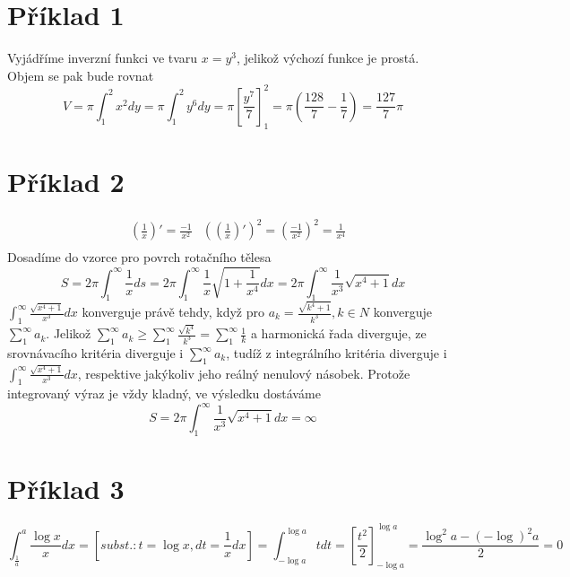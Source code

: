 \documentclass[11pt,a4paper]{article}
\begin{document}
\section*{Příklad 1}
Vyjádříme inverzní funkci ve tvaru $x = y^3$, jelikož výchozí funkce je prostá. Objem se pak bude rovnat
\begin{equation*}
V = \pi \int_1^2 x^2 dy =\pi \int_1^2 y^6 dy =\pi \left[ \frac{y^7}{7} \right]_1^2 =
\pi\left(\frac{128}{7} - \frac{1}{7}\right) = \frac{127}{7}\pi
\end{equation*}

\section*{Příklad 2}
\begin{align*}
 & \left(\frac{1}{x}\right)' = \frac{-1}{x^2} 
 & \left(\left(\frac{1}{x}\right)'\right)^2 = \left(\frac{-1}{x^2}\right)^2 = \frac{1}{x^4} \\
\end{align*}
Dosadíme do vzorce pro povrch rotačního tělesa
\begin{equation*}
S = 2\pi \int_1^\infty \frac{1}{x} ds = 2\pi \int_1^\infty \frac{1}{x}\sqrt{1+\frac{1}{x^4}} dx = 2\pi \int_1^\infty \frac{1}{x^3} \sqrt{x^4+1} dx
\end{equation*}
$
\int_1^\infty \frac{\sqrt{x^4+1}}{x^3} dx 
$
konverguje právě tehdy, když pro $a_k = \frac{\sqrt{k^4+1}}{k^3}, k\in N$ konverguje $\sum_1^\infty a_k$. Jelikož $\sum_1^\infty a_k \geq \sum_1^\infty \frac{\sqrt{k^4}}{k^3} = \sum_1^\infty \frac{1}{k}$ a harmonická řada diverguje, ze srovnávacího kritéria diverguje i $\sum_1^\infty a_k$, tudíž z integrálního kritéria diverguje i $\int_1^\infty \frac{\sqrt{x^4+1}}{x^3} dx$, respektive jakýkoliv jeho reálný nenulový násobek. Protože integrovaný výraz je vždy kladný, ve výsledku dostáváme
\begin{equation*}
S = 2\pi \int_1^\infty \frac{1}{x^3} \sqrt{x^4+1} dx = \infty
\end{equation*}

\section*{Příklad 3}
\begin{equation*}
\int_\frac{1}{a}^a \frac{\log x }{x} dx =[subst.: t = \log x, dt = \frac{1}{x}dx]
= \int_{-\log a}^{\log a} t dt =
\left[ \frac{t^2}{2} \right]_{-\log a}^{\log a} = \frac{\log^2 a - (-\log)^2 a}{2} = 0
\end{equation*}
\end{document}
